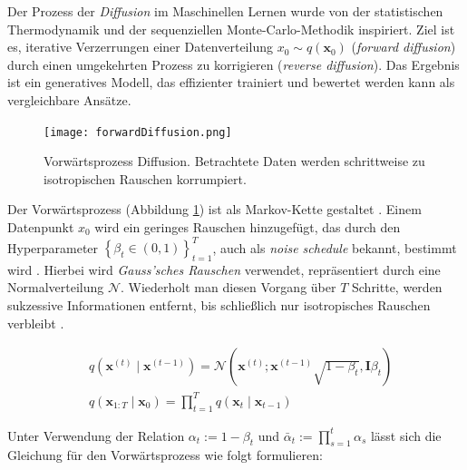 \documentclass[
  a4paper,  %
  twoside,  %
  bibliography=totoc,
  headsepline,
  cleardoublepage=empty,
  parskip=half,
  draft=false
]{scrbook}
\begin{document}
Der Prozess der \emph{Diffusion} im Maschinellen Lernen \cite{sohl-dickstein_deep_2015, ho_denoising_2020, nichol_improved_2021, dhariwal_diffusion_2021} wurde von der statistischen Thermodynamik \cite{jarzynski_equilibrium_1997} und der sequenziellen Monte-Carlo-Methodik \cite{neal_annealed_1998} inspiriert. Ziel ist es, iterative Verzerrungen einer Datenverteilung $x_0\sim q(\mathbf{x}_0)$ (\emph{forward diffusion}) durch einen umgekehrten Prozess zu korrigieren (\emph{reverse diffusion}). Das Ergebnis ist ein generatives Modell, das effizienter trainiert und bewertet werden kann als vergleichbare Ansätze. \cite{sohl-dickstein_deep_2015, nichol_improved_2021}

\begin{figure}[h]
  \centering
  \texttt{[image: forwardDiffusion.png]}
  \caption[Vorwärtsprozess Diffusion]{Vorwärtsprozess Diffusion. Betrachtete Daten werden schrittweise zu isotropischen Rauschen korrumpiert. \cite{machine_learning_at_berkeley_diffusion_2022}}
  \label{fig:forwardDiffusion}
\end{figure} 

Der Vorwärtsprozess (Abbildung \ref{fig:forwardDiffusion}) ist als Markov-Kette gestaltet \cite{sohl-dickstein_deep_2015, ho_denoising_2020}. Einem Datenpunkt $x_0$ wird ein geringes Rauschen hinzugefügt, das durch den Hyperparameter $\left\{\beta_t \in(0,1)\right\}_{t=1}^T$, auch als \emph{noise schedule} bekannt, bestimmt wird \cite{ho_denoising_2020, machine_learning_at_berkeley_diffusion_2022}. Hierbei wird \emph{Gauss'sches Rauschen} \cite{shannon_communication_1949} verwendet, repräsentiert durch eine Normalverteilung $\mathcal{N}$. Wiederholt man diesen Vorgang über $T$ Schritte, werden sukzessive Informationen entfernt, bis schließlich nur isotropisches Rauschen verbleibt \cite{machine_learning_at_berkeley_diffusion_2022}.

\begin{align}
   & q\left(\mathbf{x}^{(t)} \mid \mathbf{x}^{(t-1)}\right) = \mathcal{N}\left(\mathbf{x}^{(t)} ; \mathbf{x}^{(t-1)} \sqrt{1-\beta_t}, \mathbf{I} \beta_t\right) \\
   & q\left(\mathbf{x}_{1: T} \mid \mathbf{x}_0\right)=\prod_{t=1}^T q\left(\mathbf{x}_t \mid \mathbf{x}_{t-1}\right)
\end{align}

Unter Verwendung der Relation \( \alpha_t:=1-\beta_t \) und \( \bar{\alpha}_t:=\prod_{s=1}^t \alpha_s \) lässt sich die Gleichung für den Vorwärtsprozess wie folgt formulieren:
\end{document}
